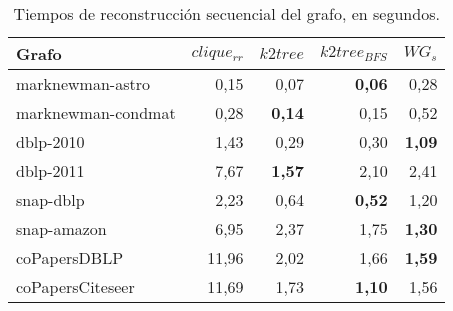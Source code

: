 \begin{table}
	\caption{Tiempos de reconstrucción secuencial del grafo, en segundos.}
	\label{table:timesSecuencial}
	\centering
	\begin{tabular}{l|r|r|r|r}
		\toprule
		Grafo & $clique_{rr}$ & $k2tree$ & $k2tree_{BFS}$ & $WG_{s}$ \\
		\midrule	
		marknewman-astro & 0,15 & 0,07 & \textbf{0,06} & 0,28 \\
		marknewman-condmat & 0,28 & \textbf{0,14} & 0,15 & 0,52 \\
		dblp-2010 & 1,43 & 0,29 & 0,30 & \textbf{1,09} \\
        dblp-2011 & 7,67 & \textbf{1,57} & 2,10 & 2,41 \\
		snap-dblp & 2,23 & 0,64 & \textbf{0,52} & 1,20 \\
        snap-amazon & 6,95 & 2,37 & 1,75 & \textbf{1,30} \\
        coPapersDBLP & 11,96 & 2,02 & 1,66 & \textbf{1,59} \\
        coPapersCiteseer & 11,69 & 1,73 & \textbf{1,10} & 1,56 \\
        \bottomrule
	\end{tabular}
\end{table}

